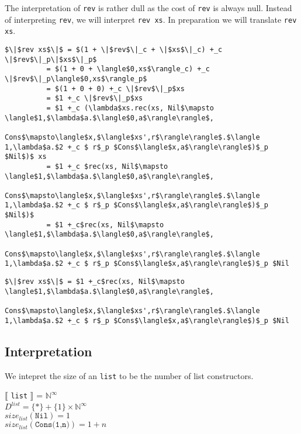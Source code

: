 \documentclass[12pt,letterpaper]{article}
\begin{document}
The interpretation of \texttt{rev} is rather dull as the cost of \texttt{rev} is always null.
Instead of interpreting \texttt{rev}, we will interpret \texttt{rev xs}.
In preparation we will translate \texttt{rev xs}.
\begin{lstlisting}
$\|$rev xs$\|$ = $(1 + \|$rev$\|_c + \|$xs$\|_c) +_c \|$rev$\|_p\|$xs$\|_p$
          = $(1 + 0 + \langle$0,xs$\rangle_c) +_c \|$rev$\|_p\langle$0,xs$\rangle_p$
          = $(1 + 0 + 0) +_c \|$rev$\|_p$xs
          = $1 +_c \|$rev$\|_p$xs
          = $1 +_c (\lambda$xs.rec(xs, Nil$\mapsto \langle$1,$\lambda$a.$\langle$0,a$\rangle\rangle$,
                      Cons$\mapsto\langle$x,$\langle$xs',r$\rangle\rangle$.$\langle 1,\lambda$a.$2 +_c $ r$_p $Cons$\langle$x,a$\rangle\rangle$)$_p $Nil$)$ xs
          = $1 +_c $rec(xs, Nil$\mapsto \langle$1,$\lambda$a.$\langle$0,a$\rangle\rangle$,
                      Cons$\mapsto\langle$x,$\langle$xs',r$\rangle\rangle$.$\langle 1,\lambda$a.$2 +_c $ r$_p $Cons$\langle$x,a$\rangle\rangle$)$_p $Nil$)$
          = $1 +_c$rec(xs, Nil$\mapsto \langle$1,$\lambda$a.$\langle$0,a$\rangle\rangle$,
                  Cons$\mapsto\langle$x,$\langle$xs',r$\rangle\rangle$.$\langle 1,\lambda$a.$2 +_c $ r$_p $Cons$\langle$x,a$\rangle\rangle$)$_p $Nil
\end{lstlisting}
\begin{framed}
\begin{small}
\begin{lstlisting}
$\|$rev xs$\|$ = $1 +_c$rec(xs, Nil$\mapsto \langle$1,$\lambda$a.$\langle$0,a$\rangle\rangle$,
                  Cons$\mapsto\langle$x,$\langle$xs',r$\rangle\rangle$.$\langle 1,\lambda$a.$2 +_c $ r$_p $Cons$\langle$x,a$\rangle\rangle$)$_p $Nil
\end{lstlisting}
\end{small}
\end{framed}

\subsection*{Interpretation}

We intepret the size of an \texttt{list} to be the number of list constructors.
\begin{framed}
$\llbracket$ \texttt{list} $\rrbracket$ = $\mathbb{N}^\infty$\\
$D^{list} = \{\ast\} + \{1\} \times \mathbb{N}^\infty$\\
$size_{list}(\texttt{Nil}) = 1$\\
$size_{list}(\texttt{Cons(1,n)}) = 1 + n$\\
\end{framed}
\end{document}
